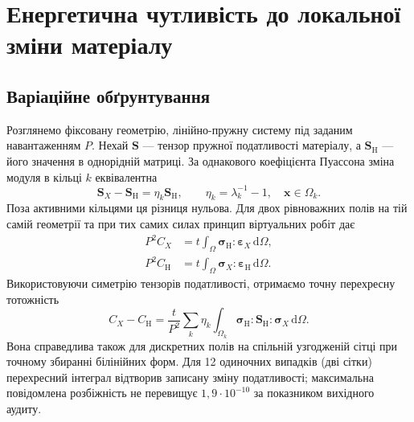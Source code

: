 \section{Енергетична чутливість до локальної зміни матеріалу}
\label{sec:ring-sensitivity}

\subsection{Варіаційне обґрунтування}

Розглянемо фіксовану геометрію, лінійно-пружну систему під заданим навантаженням $P$. Нехай $\boldsymbol S$ --- тензор пружної податливості матеріалу, а $\boldsymbol S_{\mathrm H}$ --- його значення в однорідній матриці. За однакового коефіцієнта Пуассона зміна модуля в кільці $k$ еквівалентна
\begin{equation}
 \boldsymbol S_X-\boldsymbol S_{\mathrm H}
 =\eta_k\boldsymbol S_{\mathrm H},\qquad
 \eta_k=\lambda_k^{-1}-1,\quad \boldsymbol x\in\Omega_k .
 \label{eq:ring-eta}
\end{equation}
Поза активними кільцями ця різниця нульова. Для двох рівноважних полів на тій самій геометрії та при тих самих силах принцип віртуальних робіт дає
\begin{equation}
 \begin{aligned}
 P^2 C_X &=t\int_\Omega \boldsymbol\sigma_{\mathrm H}:
                     \boldsymbol\varepsilon_X\,\mathrm d\Omega,\\
 P^2 C_{\mathrm H}&=t\int_\Omega \boldsymbol\sigma_X:
                     \boldsymbol\varepsilon_{\mathrm H}\,\mathrm d\Omega .
 \end{aligned}
 \label{eq:ring-betti-works}
\end{equation}
Використовуючи симетрію тензорів податливості, отримаємо точну перехресну тотожність
\begin{equation}
 C_X-C_{\mathrm H}=\frac{t}{P^2}\sum_k\eta_k
 \int_{\Omega_k}
 \boldsymbol\sigma_{\mathrm H}:\boldsymbol S_{\mathrm H}:
 \boldsymbol\sigma_X\,\mathrm d\Omega .
 \label{eq:ring-betti}
\end{equation}
Вона справедлива також для дискретних полів на спільній узгодженій сітці при точному збиранні білінійних форм. Для 12 одиночних випадків (дві сітки) перехресний інтеграл відтворив записану зміну податливості; максимальна повідомлена розбіжність не перевищує $1{,}9\cdot10^{-10}$ за показником вихідного аудиту.

